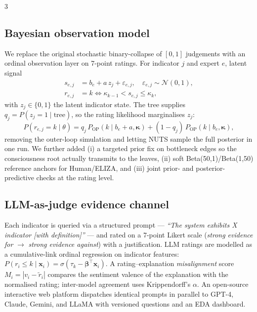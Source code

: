 \documentclass[a0,portrait]{a0poster}
\begin{document}
\begin{multicols}{3}
\subsection*{\color{PosterAccent} Bayesian observation model}
We replace the original stochastic binary-collapse of $[0,1]$ judgements with an ordinal observation layer on 7-point ratings. For indicator $j$ and expert $e$, latent signal
\begin{align*}
s_{e,j} &= b_e + a\, z_j + \varepsilon_{e,j}, \quad \varepsilon_{e,j}\sim\mathcal{N}(0,1),\\
r_{e,j} &= k \iff \kappa_{k-1} < s_{e,j} \le \kappa_k,
\end{align*}
with $z_j\in\{0,1\}$ the latent indicator state. The tree supplies $q_j=P(z_j=1\mid \text{tree})$, so the rating likelihood marginalises $z_j$:
\[
P(r_{e,j}=k\mid\theta) = q_j\,P_{\mathrm{OP}}(k\mid b_e + a, \boldsymbol{\kappa}) + (1-q_j)\,P_{\mathrm{OP}}(k\mid b_e, \boldsymbol{\kappa}),
\]
removing the outer-loop simulation and letting NUTS sample the full posterior in one run. We further added (i) a targeted prior fix on bottleneck edges so the consciousness root actually transmits to the leaves, (ii) soft Beta(50,1)/Beta(1,50) reference anchors for Human/ELIZA, and (iii) joint prior- and posterior-predictive checks at the rating level.

\subsection*{\color{PosterAccent} LLM-as-judge evidence channel}
Each indicator is queried via a structured prompt --- \textit{``The system exhibits X indicator [with definition]''} --- and rated on a 7-point Likert scale (\textit{strong evidence for} $\to$ \textit{strong evidence against}) with a justification. LLM ratings are modelled as a cumulative-link ordinal regression on indicator features:
$P(r_i\le k\mid \mathbf{x}_i) = \sigma(\tau_k - \boldsymbol{\beta}^\top\mathbf{x}_i)$.
A rating--explanation \emph{misalignment} score $M_i = |v_i - \tilde r_i|$ compares the sentiment valence of the explanation with the normalised rating; inter-model agreement uses Krippendorff's $\alpha$. An open-source interactive web platform dispatches identical prompts in parallel to GPT-4, Claude, Gemini, and LLaMA with versioned questions and an EDA dashboard.



\end{multicols}
\end{document}
